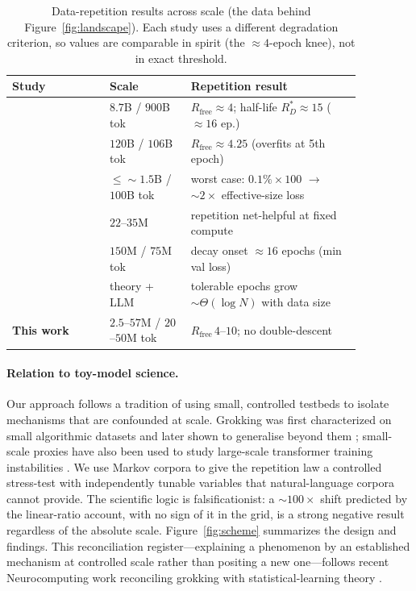 \documentclass[11pt]{article}
\begin{document}
\begin{table}[htbp]
\centering
\caption{Data-repetition results across scale (the data behind Figure~\ref{fig:landscape}).
Each study uses a different degradation criterion, so values are comparable in spirit
(the ${\approx}4$-epoch knee), not in exact threshold.}
\label{tab:repeat-landscape}
\small
\begin{tabular}{@{}>{\raggedright\arraybackslash}p{0.24\linewidth}>{\raggedright\arraybackslash}p{0.20\linewidth}>{\raggedright\arraybackslash}p{0.42\linewidth}@{}}
\toprule
Study & Scale & Repetition result \\
\midrule
\citet{muennighoff2023scaling} & $8.7$B / $900$B tok & $R_{\mathrm{free}}{\approx}4$; half-life $R^{*}_{D}{\approx}15$ (${\approx}16$ ep.) \\
\citet{taylor2022galactica} & $120$B / $106$B tok & $R_{\mathrm{free}}{\approx}4.25$ (overfits at 5th epoch) \\
\citet{hernandez2022repeateddata} & ${\le}{\sim}1.5$B / $100$B tok & worst case: $0.1\%{\times}100$ $\to$ ${\sim}2\times$ effective-size loss \\
\citet{charton2024repeated} & $22$--$35$M & repetition net-helpful at fixed compute \\
\citet{chen2026augment} & $150$M / $75$M tok & decay onset ${\approx}16$ epochs (min val loss) \\
\citet{yan2025repeatmore} & theory + LLM & tolerable epochs grow ${\sim}\Theta(\log N)$ with data size \\
\textbf{This work} & $2.5$--$57$M / $20$--$50$M tok & $R_{\mathrm{free}}\,4$--$10$; no double-descent \\
\bottomrule
\end{tabular}
\end{table}

\paragraph{Relation to toy-model science.}
Our approach follows a tradition of using small, controlled testbeds to isolate mechanisms
that are confounded at scale. Grokking was first characterized on small algorithmic datasets \citep{power2022grokking}
and later shown to generalise beyond them \citep{liu2023omnigrok}; small-scale proxies have
also been used to study large-scale transformer training instabilities
\citep{wortsman2023smallscale}. We use Markov corpora to give the repetition law a
controlled stress-test with independently tunable variables that natural-language corpora
cannot provide. The scientific logic is
falsificationist: a ${\sim}100\times$ shift predicted by the linear-ratio account, with
no sign of it in the grid, is a strong negative result regardless of the absolute scale. Figure~\ref{fig:scheme} summarizes the design and findings. This reconciliation
register---explaining a phenomenon by an established mechanism at controlled scale
rather than positing a new one---follows recent Neurocomputing work reconciling
grokking with statistical-learning theory \citep{neucom2026grokking}.
\end{document}
